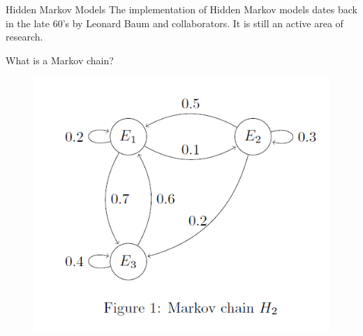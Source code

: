 \documentclass{beamer}
\begin{document}
\begin{frame}{Hidden Markov Models}
	The implementation of Hidden Markov models dates back in the late 60's by Leonard Baum and collaborators. It is still an active area of research. 	
	
	What is a Markov chain?
	\begin{figure}[h]
		\centering
			\includegraphics[scale=0.6]{../Figures/fig_markov_chain.png}
	\end{figure}
	
	
\end{frame}
\end{document}
